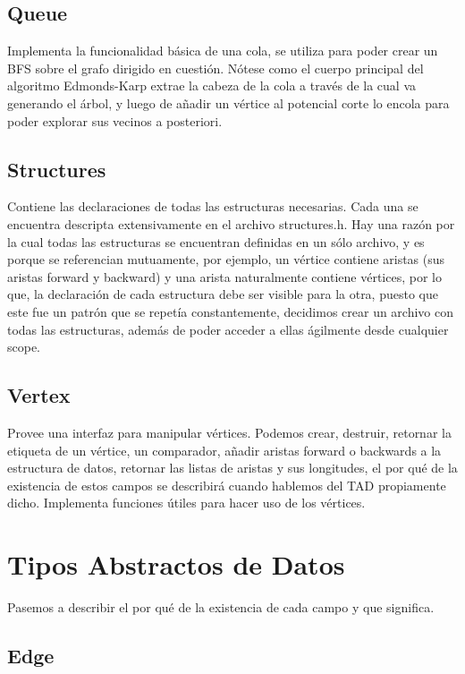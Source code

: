 \documentclass[11pt]{article}
\begin{document}
\subsection{Queue}
\label{sec-4-7}

Implementa la funcionalidad básica de una cola, se utiliza para poder
crear un BFS sobre el grafo dirigido en cuestión. Nótese como el
cuerpo principal del algoritmo Edmonds-Karp extrae la cabeza de la
cola a través de la cual va generando el árbol, y luego de añadir un
vértice al potencial corte lo encola para poder explorar sus vecinos
a posteriori.
\subsection{Structures}
\label{sec-4-8}

Contiene las declaraciones de todas las estructuras necesarias. Cada
una se encuentra descripta extensivamente en el archivo structures.h.
Hay una razón por la cual todas las estructuras se encuentran
definidas en un sólo archivo, y es porque se referencian mutuamente,
por ejemplo, un vértice contiene aristas (sus aristas forward y
backward) y una arista naturalmente contiene vértices, por lo que, la
declaración de cada estructura debe ser visible para la otra, puesto
que este fue un patrón que se repetía constantemente, decidimos crear
un archivo con todas las estructuras, además de poder acceder a ellas
ágilmente desde cualquier scope.
\subsection{Vertex}
\label{sec-4-9}

Provee una interfaz para manipular vértices. Podemos crear, destruir,
retornar la etiqueta de un vértice, un comparador, añadir aristas
forward o backwards a la estructura de datos, retornar las listas de
aristas y sus longitudes, el por qué de la existencia de estos campos
se describirá cuando hablemos del TAD propiamente dicho.
Implementa funciones útiles para hacer uso de los vértices.
\section{Tipos Abstractos de Datos}
\label{sec-5}

Pasemos a describir el por qué de la existencia de cada campo y que significa.
\subsection{Edge}
\label{sec-5-1}
\end{document}
